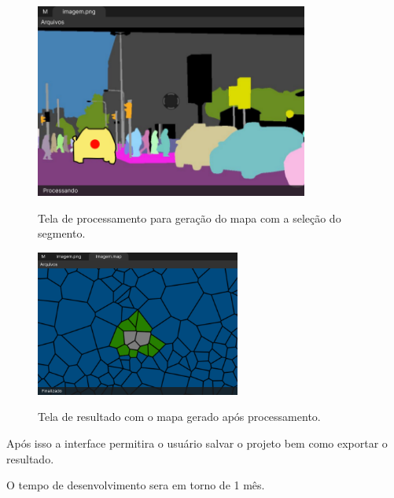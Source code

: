 \begin{figure}[H]
	\centering
    \caption{Tela de processamento para geração do mapa com a seleção do segmento.}
	\includegraphics[width=0.8\textwidth]{figures/tela_processando_2.png}
	\label{fig:tela_processando_2}
\end{figure}


\begin{figure}[H]
	\centering
    \caption{Tela de resultado com o mapa gerado após processamento.}
	\includegraphics[width=0.6\textwidth]{figures/tela_mapa.png}
	\label{fig:tela_mapa}
\end{figure}

Após isso a interface permitira o usuário salvar o projeto bem como exportar o resultado.

O tempo de desenvolvimento sera em torno de 1 mês.

